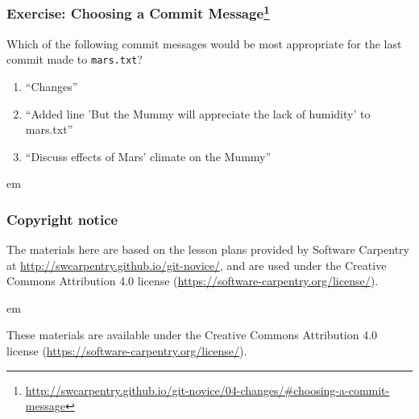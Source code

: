 \documentclass[aspectratio=1610]{beamer}
\newcommand{\correctans}{\textcolor{green!50!black}{\CheckmarkBold}}
\newcommand{\wrongans}{\textcolor{red!50!black}{\XSolidBold}}
\begin{document}
\begin{frame}
{\begin{minipage}{\textwidth}

  \end{minipage}
}
\end{frame}

\begin{frame}[fragile]
\frametitle{Exercise: Choosing a Commit Message\footnote{\url{http://swcarpentry.github.io/git-novice/04-changes/\#choosing-a-commit-message}}}

Which of the following commit messages would be most appropriate for the last commit made to \texttt{mars.txt}?

\begin{enumerate}
  \item ``Changes'' \onslide<2->{\wrongans}
  \item ``Added line 'But the Mummy will appreciate the lack of humidity' to mars.txt'' \onslide<2->{\wrongans}
  \item ``Discuss effects of Mars’ climate on the Mummy'' \onslide<2->{\correctans}
\end{enumerate}

 em


\end{frame}

\begin{frame}
\end{frame}

\begin{frame}
\frametitle{Copyright notice}

The materials here are based on the lesson plans provided by Software Carpentry at \url{http://swcarpentry.github.io/git-novice/}, and are used under the Creative Commons Attribution 4.0 license (\url{https://software-carpentry.org/license/}).

 em

These materials are available under the Creative Commons Attribution 4.0 license (\url{https://software-carpentry.org/license/}).

\end{frame}
\end{document}
